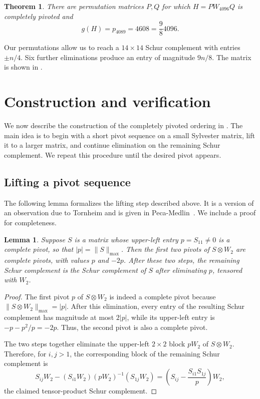 \documentclass{article}
\newtheorem{theorem}{Theorem}
\newtheorem{lemma}{Lemma}
\begin{document}
\begin{theorem}\label{thm:main}
There are permutation matrices $P,Q$ for which
$H=PW_{4096}Q$ is completely pivoted and
\[
       g(H)=p_{4089}=4608=\frac{9}{8}4096.
\]
\end{theorem}


Our permutations allow us to reach a $14\times14$ Schur complement with entries $\pm n/4$.
Six further eliminations produce an entry of magnitude $9n/8$.
The matrix is shown in .

\section{Construction and verification}\label{sec:construction}

We now describe the construction of the completely pivoted ordering in
. The main idea is to begin with a short pivot sequence on a
small Sylvester matrix, lift it to a larger matrix, and continue elimination
on the remaining Schur complement. We repeat this procedure until the desired
pivot appears.

\subsection{Lifting a pivot sequence}\label{sec:lifting}
The following lemma formalizes the lifting step described above. It is a version of an observation due to Tornheim and is given in Peca-Medlin~\cite[Proposition 2.10]{PM}.
We include a proof for completeness.


\begin{lemma}\label{lem:lift}
Suppose $S$ is a matrix whose upper-left entry $p=S_{11}\ne0$
is a complete pivot, so that $|p|=\|S\|_{\max}$. Then the first two pivots of $S\otimes W_2$ are complete pivots, with values $p$ and $-2p$. After these two steps, the remaining Schur complement is the Schur complement of $S$ after eliminating $p$, tensored with $W_2$.
\end{lemma}

\begin{proof}
The first pivot $p$ of $S\otimes W_2$ is indeed a complete pivot because
$\|S\otimes W_2\|_{\max}=|p|$. After this elimination, every entry of the resulting Schur complement has magnitude at most $2|p|$, while its upper-left entry is $-p-p^2/p=-2p$. Thus, the second pivot is also a complete pivot.

The two steps together eliminate the upper-left $2\times2$ block $pW_2$ of $S\otimes W_2$. Therefore, for $i,j>1$, the
corresponding block of the remaining Schur complement is
\[
S_{ij}W_2-(S_{i1}W_2)(pW_2)^{-1}(S_{1j}W_2)
=\left(S_{ij}-\frac{S_{i1}S_{1j}}{p}\right)W_2,
\]
the claimed tensor-product Schur complement.
\end{proof}
\end{document}
